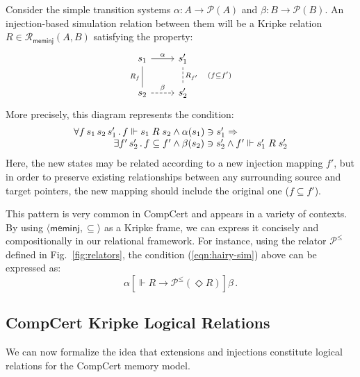 \documentclass[sigplan,10pt,review,anonymous]{acmart}\settopmatter{printfolios=true,printccs=false,printacmref=false}
\newcommand{\kw}[1]{\ensuremath{ \mathsf{#1} }}
\newcommand{\ifr}[1]{\mathrel{[{#1}]}}
\begin{document}
\begin{example} \label{ex:sim} %
Consider the simple transition systems
$\alpha : A \rightarrow \mathcal{P}(A)$ and
$\beta : B \rightarrow \mathcal{P}(B)$.
An injection-based simulation relation between them
will be a Kripke relation
$R \in \mathcal{R}_\kw{meminj}(A, B)$
satisfying the property:
\[
  \begin{tikzcd}
    s_1 \arrow[r, "\alpha"]
        \arrow[d, dash, "R_f"'] &
    s_1' \arrow[d, dashed, dash, "R_{f'} \quad (f \subseteq f')"] \\
    s_2 \arrow[r, dashed, "\beta"] &
    s_2'
  \end{tikzcd}
\]
More precisely, this diagram represents the condition:
\begin{equation}
    \label{eqn:hairy-sim}
    \begin{array}{r@{}l}
    \forall f \, s_1 \, s_2 \, s_1' \,.\,
      f \Vdash s_1 \mathrel{R} s_2 &{} \wedge
      \alpha(s_1) \ni s_1' \Rightarrow \\
    \exists f' \, s_2' \,.\,
      f \subseteq f' &{} \wedge
      \beta(s_2) \ni s_2' \wedge
      f' \Vdash s_1' \mathrel{R} s_2'
    \end{array}
\end{equation}
Here, the new states may be related according to
a new injection mapping $f'$,
but in order to preserve existing relationships
between any surrounding source and target pointers,
the new mapping should include
the original one ($f \subseteq f'$).

This pattern is very common in CompCert
and appears in a variety of contexts.
By using $\langle \kw{meminj}, {\subseteq} \rangle$
as a Kripke frame,
we can express it concisely and compositionally
in our relational framework.
For instance,
using the relator $\mathcal{P}^\le$ defined in
Fig.~\ref{fig:relators},
the condition (\ref{eqn:hairy-sim}) above can be expressed
as:
\[
  \alpha \ifr{\Vdash R \rightarrow \mathcal{P}^\le(\Diamond R)} \beta \,.
\]
\end{example}


\subsection{CompCert Kripke Logical Relations} \label{sec:cklrdef} %

We can now formalize the idea that
extensions and injections
constitute logical relations for the CompCert memory model.
\end{document}
